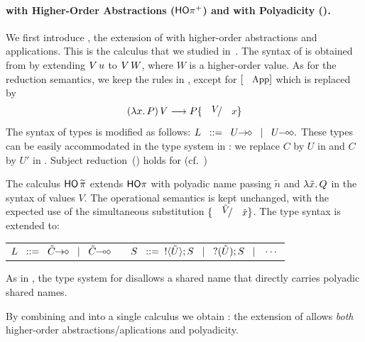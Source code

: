 \documentclass[runningheads]{llncs}
\begin{document}
{{\paragraph{\HOp with Higher-Order Abstractions ($\mathsf{HO\pi^{+}}$) and 
with Polyadicity (\PHOp).
}
We first introduce \HOpp, the  extension of \HOp with higher-order abstractions and applications.
This is the calculus that we studied in~\cite{characteristic_bis}. The syntax of \HOpp is obtained 
from   by extending
$V\, {u}$ to $V\, {W}$, where  $W$ is a higher-order value. 
As for the reduction semantics, we keep the rules in , except for 
 $\orule{App}$ which is replaced by 
$$
	\appl{(\abs{x}{P})}{V} \red P \subst{V}{x}
$$
The syntax of types is modified as follows: %
$
		L \bnfis \shot{U} \bnfbar \lhot{U}.
$
These types can be easily accommodated in the type system 
in :
we replace $C$ by $U$ in  and $C$ by $U'$ in . Subject
reduction~() holds for \HOpp (cf.~\cite{characteristic_bis})

%
The calculus  
$\mathsf{HO}\,{\widetilde{\pi}}$ 
extends $\mathsf{HO}\pi$ 
with polyadic name passing $\tilde{n}$ and $\lambda \tilde{x}.\,Q$ in the syntax 
of values $V$. 
The operational semantics is kept unchanged, with the expected use of the simultaneous substitution $\subst{\tilde{V}}{\tilde{x}}$.
The type syntax is extended to: 
%
\begin{center}
	\begin{tabular}{c}
	$	L \bnfis \shot{\tilde{C}} \bnfbar \lhot{\tilde{C}}
		\quad\quad
		S \bnfis  \btout{\tilde{U}} S \bnfbar \btinp{\tilde{U}} S \bnfbar \cdots$
	\end{tabular}
\end{center}
%
As in \cite{tlca07,MostrousY15},
the type system for \PHOp 
disallows a shared name that directly carries polyadic
shared names.

By combining \HOpp and \PHOp into a single calculus we obtain \PHOpp:
the extension of \HOp allows \emph{both} higher-order
abstractions/aplications and polyadicity.


}}
\end{document}
